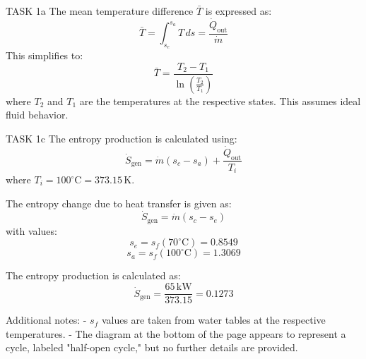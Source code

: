 TASK 1a  
The mean temperature difference \( \bar{T} \) is expressed as:  
\[
\bar{T} = \int_{s_e}^{s_a} T \, ds = \frac{\dot{Q}_{\text{out}}}{\dot{m}}
\]  
This simplifies to:  
\[
\bar{T} = \frac{T_2 - T_1}{\ln\left(\frac{T_2}{T_1}\right)}
\]  
where \( T_2 \) and \( T_1 \) are the temperatures at the respective states. This assumes ideal fluid behavior.  

TASK 1c  
The entropy production is calculated using:  
\[
\dot{S}_{\text{gen}} = \dot{m}(s_c - s_a) + \frac{\dot{Q}_{\text{out}}}{T_i}
\]  
where \( T_i = 100^\circ\text{C} = 373.15 \, \text{K} \).  

The entropy change due to heat transfer is given as:  
\[
\dot{S}_{\text{gen}} = \dot{m}(s_c - s_e)
\]  
with values:  
\[
s_e = s_f(70^\circ\text{C}) = 0.8549
\]  
\[
s_a = s_f(100^\circ\text{C}) = 1.3069
\]  

The entropy production is calculated as:  
\[
\dot{S}_{\text{gen}} = \frac{65 \, \text{kW}}{373.15} = 0.1273
\]  

Additional notes:  
- \( s_f \) values are taken from water tables at the respective temperatures.  
- The diagram at the bottom of the page appears to represent a cycle, labeled "half-open cycle," but no further details are provided.  

